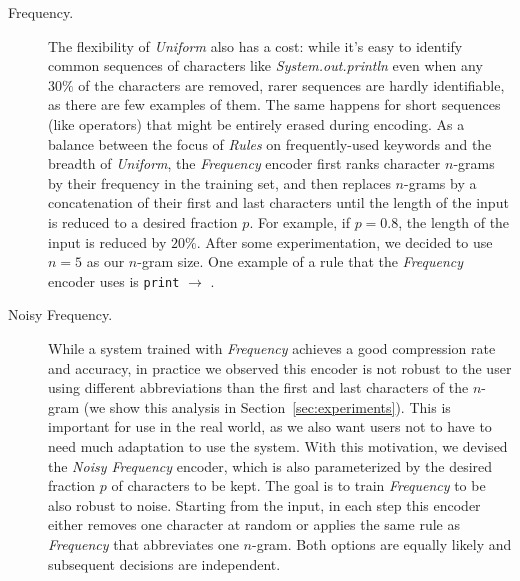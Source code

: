 \documentclass{article}
\begin{document}
\begin{description}
    \item[Frequency. ]{
        The flexibility of \emph{Uniform} also has a
        cost: while it's easy to identify common
        sequences of characters like \emph{System.out.println} even when any
        $30\%$ of the characters are removed, rarer
        sequences are hardly identifiable, as there
        are few examples of them. The same happens
        for short sequences (like operators) that
        might be entirely erased during encoding.
        As a balance between the focus of \emph{Rules}
        on frequently-used keywords and the breadth
        of \emph{Uniform}, the \emph{Frequency}
        encoder first ranks character $n$-grams by
        their frequency in the training set, and then
        replaces $n$-grams by a concatenation of
        their first and last characters until the length
        of the input is reduced to a desired fraction $p$. For example, if $p = 0.8$, the length
        of the input is reduced by $20\%$.
        After some experimentation, we decided
        to use $n = 5$ as our $n$-gram size.
        One example of a rule that the
        \emph{Frequency} encoder uses is
        \texttt{print} $\rightarrow$ .
    }
    \item[Noisy Frequency. ]{
        While a system trained with
        \emph{Frequency} achieves a good
        compression rate and accuracy, in practice we
        observed this encoder is not robust to
        the user using different abbreviations
        than the first and last characters of the
        $n$-gram (we show this analysis in
        Section~\ref{sec:experiments}). This is important for use in the
        real world, as we also want users not to have
        to need much adaptation to use the system.
        With this motivation, we devised the
        \emph{Noisy Frequency} encoder, which is
        also parameterized by the desired fraction $p$
        of characters to be kept. The goal is to train
        \emph{Frequency} to be also robust to noise.
        Starting from the
        input, in each step this encoder either removes
        one character at random or applies the
        same rule as \emph{Frequency} that abbreviates
        one $n$-gram. Both options are equally likely
        and subsequent decisions are independent.
    }
\end{description}
\end{document}
